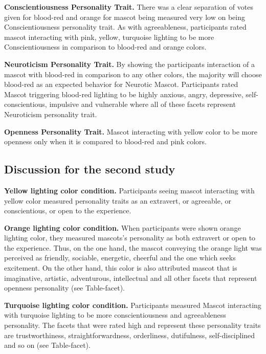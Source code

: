 \par\textbf{Conscientiousness Personality Trait.}
There was a clear separation of votes given for blood-red and orange for mascot being measured very low
on being Conscientiousness personality trait.
As with agreeableness, participants rated mascot interacting with pink, yellow, turquoise lighting to be more
Conscientiousness in comparison to blood-red and orange colors.

\par\textbf{Neuroticism Personality Trait.}
By showing the participants interaction of a mascot with blood-red in comparison to any other colors,
the majority will choose blood-red as an expected behavior for Neurotic Mascot.
Participants rated Mascot triggering blood-red lighting to be highly anxious, angry, depressive, self-conscientious,
impulsive and vulnerable where all of these facets represent Neuroticism personality trait.

\par\textbf{Openness Personality Trait.}
Mascot interacting with yellow color to be more openness only when it is compared to blood-red and pink colors.

\subsection{Discussion for the second study}
\label{subsec:discussion-for-the-second-study}

\par\textbf{Yellow lighting color condition.}
Participants seeing mascot interacting with yellow color measured personality traits as an extravert, or agreeable,
or conscientious, or open to the experience.

\par\textbf{Orange lighting color condition.}
When participants were shown orange lighting color, they measured mascots's personality as both
extravert or open to the experience.
Thus, on the one hand, the mascot conveying the orange light was perceived as friendly, sociable,
energetic, cheerful and the one which seeks excitement.
On the other hand, this color is also attributed mascot that is imaginative, artistic, adventurous,
intellectual and all other facets that represent openness personality (see Table-facet).

\par\textbf{Turquoise lighting color condition.}
Participants measured Mascot interacting with turquoise lighting to be more conscientiousness and
agreeableness personality.
The facets that were rated high and represent these personality traits are trustworthiness, straightforwardness,
orderliness, dutifulness, self-disciplined and so on (see Table-facet).

